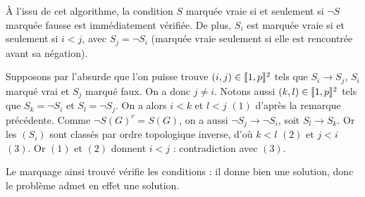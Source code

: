 À l'issu de cet algorithme, la condition $S$ marquée vraie si et seulement si
$\neg S$ marquée fausse est immédiatement vérifiée. De plus, $S_i$ est marquée
vraie si et seulement si $i < j$, avec $S_j = \neg S_i$ (marquée vraie
seulement si elle est rencontrée avant sa négation).

Supposons par l'absurde que l'on puisse trouve $(i,j)\in\llbracket 1, p \rrbracket^2$ tels que
$S_i\rightarrow S_j$, $S_i$ marqué vrai et $S_j$ marqué faux. On a donc
$j \neq i$. Notons aussi $(k,l)\in\llbracket 1, p \rrbracket^2$ tels que $S_k = \neg S_i$ et
$S_l = \neg S_j$. On a alors $i < k$ et $l < j$ $(1)$ d'après la remarque
précédente. Comme $\neg S(G)^r = S(G)$, on a aussi $\neg S_j\rightarrow \neg S_i$,
soit $S_l\rightarrow S_k$. Or les $(S_i)$ sont classés par ordre topologique
inverse, d'où $k < l$ $(2)$ et $j < i$ $(3)$. Or $(1)$ et $(2)$ donnent
$i < j$ : contradiction avec $(3)$.

Le marquage ainsi trouvé vérifie les conditions : il donne bien une solution,
donc le problème admet en effet une solution.

